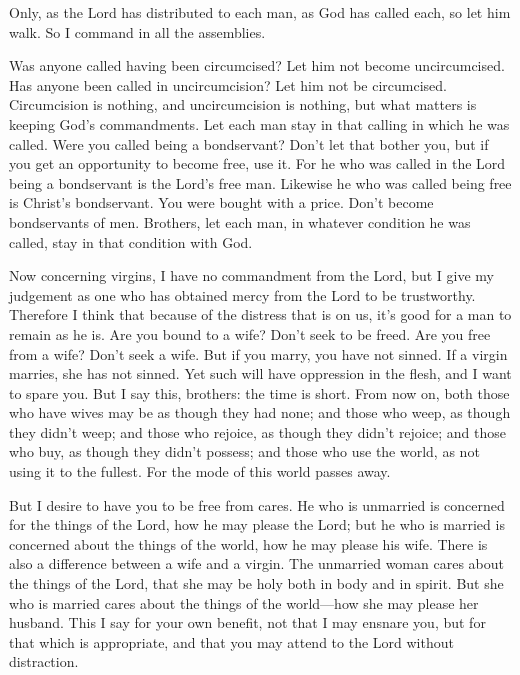  Only, as the Lord has distributed to each man, as God
has called each, so let him walk. So I command in all the assemblies.

 Was anyone called having been circumcised? Let him not
become uncircumcised. Has anyone been called in uncircumcision? Let him
not be circumcised.  Circumcision is nothing, and
uncircumcision is nothing, but what matters is keeping God's
commandments.  Let each man stay in that calling in which
he was called.  Were you called being a bondservant?
Don't let that bother you, but if you get an opportunity to become free,
use it.  For he who was called in the Lord being a
bondservant is the Lord's free man. Likewise he who was called being
free is Christ's bondservant.  You were bought with a
price. Don't become bondservants of men.  Brothers, let
each man, in whatever condition he was called, stay in that condition
with God.

 Now concerning virgins, I have no commandment from the
Lord, but I give my judgement as one who has obtained mercy from the
Lord to be trustworthy.  Therefore I think that because
of the distress that is on us, it's good for a man to remain as he is.
 Are you bound to a wife? Don't seek to be freed. Are you
free from a wife? Don't seek a wife.  But if you marry,
you have not sinned. If a virgin marries, she has not sinned. Yet such
will have oppression in the flesh, and I want to spare you.
 But I say this, brothers: the time is short. From now
on, both those who have wives may be as though they had none;
 and those who weep, as though they didn't weep; and
those who rejoice, as though they didn't rejoice; and those who buy, as
though they didn't possess;  and those who use the world,
as not using it to the fullest. For the mode of this world passes away.

 But I desire to have you to be free from cares. He who
is unmarried is concerned for the things of the Lord, how he may please
the Lord;  but he who is married is concerned about the
things of the world, how he may please his wife.  There
is also a difference between a wife and a virgin. The unmarried woman
cares about the things of the Lord, that she may be holy both in body
and in spirit. But she who is married cares about the things of the
world---how she may please her husband.  This I say for
your own benefit, not that I may ensnare you, but for that which is
appropriate, and that you may attend to the Lord without distraction.

